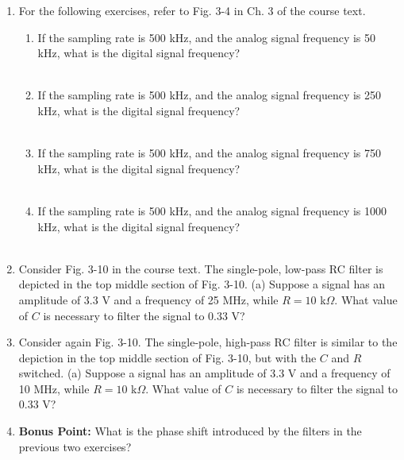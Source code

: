 \documentclass{article}
\begin{document}
\begin{enumerate}
\item For the following exercises, refer to Fig. 3-4 in Ch. 3 of the course text.
\begin{enumerate}
\item If the sampling rate is 500 kHz, and the analog signal frequency is 50 kHz, what is the digital signal frequency? \\ \\
\item If the sampling rate is 500 kHz, and the analog signal frequency is 250 kHz, what is the digital signal frequency? \\ \\
\item If the sampling rate is 500 kHz, and the analog signal frequency is 750 kHz, what is the digital signal frequency? \\ \\
\item If the sampling rate is 500 kHz, and the analog signal frequency is 1000 kHz, what is the digital signal frequency? \\ \\
\end{enumerate}
\item Consider Fig. 3-10 in the course text.  The single-pole, low-pass RC filter is depicted in the top middle section of Fig. 3-10. (a) Suppose a signal has an amplitude of 3.3 V and a frequency of 25 MHz, while $R=10$ k$\Omega$.  What value of $C$ is necessary to filter the signal to 0.33 V? \\ \vspace{4cm}
\item Consider again Fig. 3-10.  The single-pole, high-pass RC filter is similar to the depiction in the top middle section of Fig. 3-10, but with the $C$ and $R$ switched. (a) Suppose a signal has an amplitude of 3.3 V and a frequency of 10 MHz, while $R=10$ k$\Omega$.  What value of $C$ is necessary to filter the signal to 0.33 V? \\ \vspace{4cm}
\item \textbf{Bonus Point:} What is the phase shift introduced by the filters in the previous two exercises?
\end{enumerate}
\end{document}
